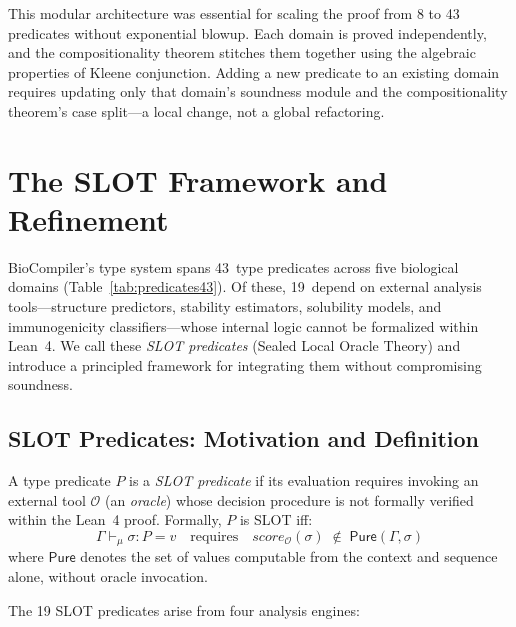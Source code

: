 \documentclass[acmsmall,review,anonymous]{acmart}
\newcommand{\seq}{\sigma}
\newcommand{\pred}{P}
\newcommand{\verdict}{v}
\newcommand{\mode}{\mu}
\newcommand{\score}{\mathit{score}}
\newcommand{\evalmode}[4]{#1 \vdash_{#2} #3 : #4}
\begin{document}
This modular architecture was essential for scaling the proof from 8
to 43 predicates without exponential blowup.
Each domain is proved independently, and the compositionality theorem
stitches them together using the algebraic properties of Kleene
conjunction.
Adding a new predicate to an existing domain requires updating only
that domain's soundness module and the compositionality theorem's
case split---a local change, not a global refactoring.


\section{The SLOT Framework and Refinement}\label{sec:slot}

BioCompiler's type system spans 43~type predicates across five
biological domains (Table~\ref{tab:predicates43}).
Of these, 19~depend on external analysis tools---structure predictors,
stability estimators, solubility models, and immunogenicity
classifiers---whose internal logic cannot be formalized within Lean~4.
We call these \emph{SLOT predicates} (Sealed Local Oracle Theory) and
introduce a principled framework for integrating them without
compromising soundness.

\subsection{SLOT Predicates: Motivation and Definition}\label{sec:slot-def}

\begin{definition}
A type predicate $\pred$ is a \emph{SLOT predicate} if its evaluation
requires invoking an external tool $\mathcal{O}$ (an \emph{oracle})
whose decision procedure is not formally verified within the Lean~4
proof. Formally, $\pred$ is SLOT iff:
\[
  \evalmode{\Gamma}{\mode}{\seq}{\pred} = \verdict
  \quad\text{requires}\quad
  \score_{\mathcal{O}}(\seq) \;\notin\; \mathsf{Pure}(\Gamma, \seq)
\]
where $\mathsf{Pure}$ denotes the set of values computable from the
context and sequence alone, without oracle invocation.
\end{definition}

The 19 SLOT predicates arise from four analysis engines:
\end{document}
